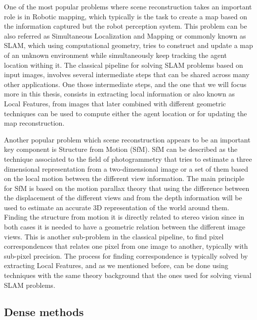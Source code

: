 One of the most popular problems where scene reconstruction takes an important role is in Robotic mapping, which typically is the task to create a map based on the information captured but the robot perception system. This problem can be also referred as Simultaneous Localization and Mapping or commonly known as SLAM, which using computational geometry, tries to construct and update a map of an unknown environment while simultaneously keep tracking the agent location withing it. The classical pipeline for solving SLAM problems based on input images, involves several intermediate steps that can be shared across many other applications. One those intermediate steps, and the one that we will focus more in this thesis, consists in extracting local information or also known as Local Features, from images that later combined with different geometric techniques can be used to compute either the agent location or for updating the map reconstruction.

Another popular problem which scene reconstruction appears to be an important key component is Structure from Motion (SfM). SfM can be described as the technique associated to the field of photogrammetry that tries to estimate a three dimensional representation from a two-dimensional image or a set of them based on the local motion between the different view information. The main principle for SfM is based on the motion parallax theory that using the difference between the displacement of the different views and from the depth information will be used to estimate an accurate 3D representation of the world around them. Finding the structure from motion it is directly related to stereo vision since in both cases it is needed to have a geometric relation between the different image views. This is another sub-problem in the classical pipeline, to find pixel correspondences that relates one pixel from one image to another, typically with sub-pixel precision. The process for finding correspondence is typically solved by extracting Local Features, and as we mentioned before, can be done using techniques with the same theory background that the ones used for solving visual SLAM problems.

\subsection{Dense methods}

